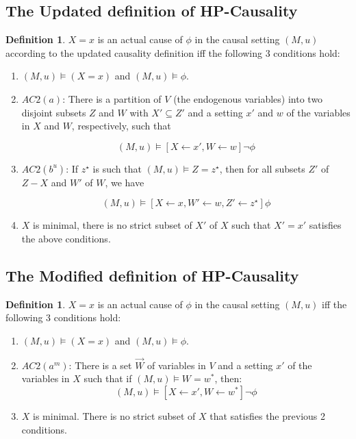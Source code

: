\documentclass{article}
\theoremstyle{plain}
\theoremstyle{definition}
\newtheorem{defn}[thm]{Definition} %
\begin{document}
\subsection{The Updated definition of HP-Causality}
\begin{defn}$X=x$ is an actual cause of $\phi$ in the causal setting $(M,u)$ according to the updated causality definition iff the following 3 conditions hold:
\begin{enumerate}
\item $(M,u) \models (X=x)$ and $(M,u) \models \phi$.
\item $AC2(a)$: There is a partition of $V$ (the endogenous variables) into two disjoint subsets $Z$ and $W$ with $X'\subseteq Z'$ and a setting $x'$ and $w$ of the variables in $X$ and $W$, respectively, such that

\[
(M,u) \models [X\leftarrow x', W\leftarrow w]\lnot \phi
\] 

\item $AC2(b^u)$: If $z^\star$ is such that $(M,u)\models Z = z^\star$, then for all subsets $Z'$ of $Z-X$ and $W'$ of $W$, we have

\[
(M,u) \models [X\leftarrow x, W' \leftarrow w, Z' \leftarrow z^\star]\phi
\] 

\item $X$ is minimal, there is no strict subset of $X'$ of $X$ such that $X' = x'$ satisfies the above conditions.
\end{enumerate}

\end{defn}













\subsection{The Modified definition of HP-Causality}
\begin{defn}$X=x$ is an actual cause of $\phi$ in the causal setting $(M,u)$ iff the following 3 conditions hold:
\begin{enumerate}
\item $(M,u) \models (X=x)$ and $(M,u) \models \phi$.
\item $AC2(a^m)$: There is a set $\vec{W}$ of variables in $V$ and a setting $x'$ of the variables in $X$ such that if $(M,u) \models W = w^*$, then:
\[
(M,u) \models [X \leftarrow x', W \leftarrow w^*] \neg \phi
\]
\item $X$ is minimal. There is no strict subset of $X$ that satisfies the previous 2 conditions.
\end{enumerate}

\end{defn}
\end{document}
